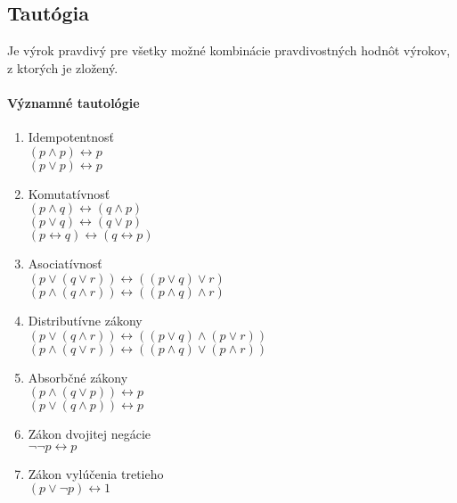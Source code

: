   \subsection{Tautógia} 
  Je výrok pravdivý pre všetky možné kombinácie pravdivostných hodnôt výrokov, z ktorých je zložený.


    \paragraph{Významné tautológie}
	\begin{enumerate}
    \item Idempotentnosť\\
    $( p \wedge p) \leftrightarrow  p $\\
    $( p \vee p) \leftrightarrow  p $\\
    \item Komutatívnosť\\
    $( p \wedge q) \leftrightarrow  ( q \wedge p)$\\
    $( p \vee q) \leftrightarrow  ( q \vee p)$ \\
    $( p \leftrightarrow  q) \leftrightarrow  ( q \leftrightarrow  p)$ \\
    \item Asociatívnosť \\
    $( p \vee ( q \vee r)) \leftrightarrow  (( p \vee q) \vee r)$\\
    $( p \wedge ( q \wedge r)) \leftrightarrow  (( p \wedge q) \wedge r)$\\
    \item Distributívne zákony \\
    $( p \vee ( q \wedge r)) \leftrightarrow  (( p \vee q) \wedge ( p \vee r))$\\
    $( p \wedge ( q \vee r)) \leftrightarrow  (( p \wedge q) \vee ( p \wedge r))$\\
    \item Absorbčné zákony\\
    $( p \wedge ( q \vee p)) \leftrightarrow  p$\\
    $( p \vee ( q \wedge p)) \leftrightarrow  p$\\
    \item Zákon dvojitej negácie\\
   	$\neg \neg  p \leftrightarrow  p$\\
    \item Zákon vylúčenia tretieho\\
    $( p \vee \neg  p) \leftrightarrow 1$\\

\end{enumerate}
